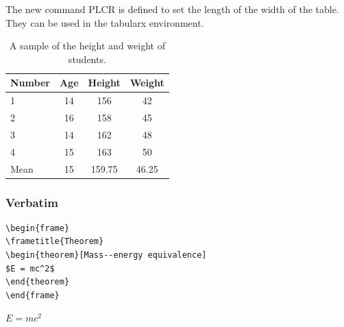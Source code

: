 \documentclass[noamsthm,notheorems,11pt,compress]{beamer}
\theoremstyle{plain} %
\numberwithin{figure}{section}
\numberwithin{table}{section}
\numberwithin{equation}{section}
\begin{document}

\begin{frame}
\frametitle{}
The new command PLCR is defined to set the length of the width of the table. They can be used in the tabularx environment.

\begin{table}[!htp]
\centering
\renewcommand\arraystretch{1.05}
\caption{A sample of the height and weight of students.}
\label{tab2:heightweight}
\begin{tabularx}{0.8\textwidth}{lCCC}
   \toprule %
	Number &  Age & Height & Weight\\
	&14&156&42\\
	2&16&158&45\\
	3&14&162&48\\
	4&15&163&50\\
	Mean &15&159.75&46.25\\
	\bottomrule
\end{tabularx}
\end{table}
\end{frame}


\begin{frame}[fragile] %
\frametitle{Verbatim}
\begin{example}
\begin{verbatim}
\begin{frame}
\frametitle{Theorem}
\begin{theorem}[Mass--energy equivalence]
$E = mc^2$
\end{theorem}
\end{frame}\end{verbatim}
\end{example}

\begin{theorem}
$E = mc^2$
\end{theorem}
\end{frame}

\end{document}
